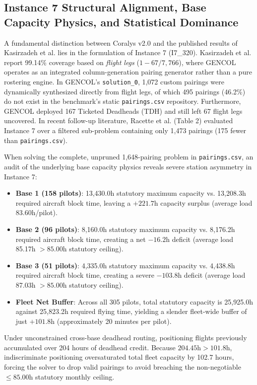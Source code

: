 \documentclass[journal]{IEEEtran}
\begin{document}
\subsection{Instance 7 Structural Alignment, Base Capacity Physics, and Statistical Dominance}

A fundamental distinction between Coralys v2.0 and the published results of Kasirzadeh et al. \cite{kasirzadeh2017} lies in the formulation of Instance 7 (I7\_320). Kasirzadeh et al. report 99.14\% coverage based on \emph{flight legs} ($1 - 67/7,766$), where GENCOL operates as an integrated column-generation pairing generator rather than a pure rostering engine. In GENCOL's \texttt{solution\_0}, 1,072 custom pairings were dynamically synthesized directly from flight legs, of which 495 pairings (46.2\%) do not exist in the benchmark's static \texttt{pairings.csv} repository. Furthermore, GENCOL deployed 167 Ticketed Deadheads (TDH) and still left 67 flight legs uncovered. In recent follow-up literature, Racette et al. \cite{racette2025} (Table 2) evaluated Instance 7 over a filtered sub-problem containing only 1,473 pairings (175 fewer than \texttt{pairings.csv}).

When solving the complete, unpruned 1,648-pairing problem in \texttt{pairings.csv}, an audit of the underlying base capacity physics reveals severe station asymmetry in Instance 7:
\begin{itemize}
    \item \textbf{Base 1 (158 pilots)}: 13,430.0h statutory maximum capacity vs. 13,208.3h required aircraft block time, leaving a $+221.7$h capacity surplus (average load 83.60h/pilot).
    \item \textbf{Base 2 (96 pilots)}: 8,160.0h statutory maximum capacity vs. 8,176.2h required aircraft block time, creating a net $-16.2$h deficit (average load 85.17h $> 85.00$h statutory ceiling).
    \item \textbf{Base 3 (51 pilots)}: 4,335.0h statutory maximum capacity vs. 4,438.8h required aircraft block time, creating a severe $-103.8$h deficit (average load 87.03h $> 85.00$h statutory ceiling).
    \item \textbf{Fleet Net Buffer}: Across all 305 pilots, total statutory capacity is 25,925.0h against 25,823.2h required flying time, yielding a slender fleet-wide buffer of just $+101.8$h (approximately 20 minutes per pilot).
\end{itemize}

Under unconstrained cross-base deadhead routing, positioning flights previously accumulated over 204 hours of deadhead credit. Because $204.45\text{h} > 101.8\text{h}$, indiscriminate positioning oversaturated total fleet capacity by 102.7 hours, forcing the solver to drop valid pairings to avoid breaching the non-negotiable $\le 85.00$h statutory monthly ceiling.
\end{document}
